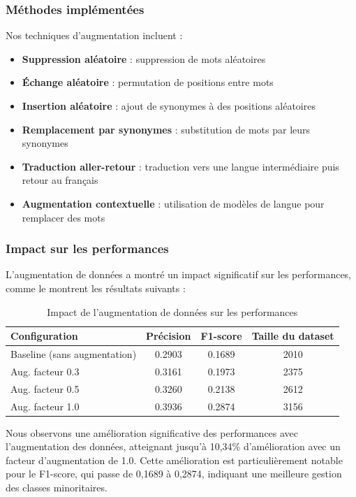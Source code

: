 \documentclass[a4paper,11pt]{article}
\begin{document}
\subsubsection{Méthodes implémentées}
Nos techniques d'augmentation incluent :

\begin{itemize}
    \item \textbf{Suppression aléatoire} : suppression de mots aléatoires
    \item \textbf{Échange aléatoire} : permutation de positions entre mots
    \item \textbf{Insertion aléatoire} : ajout de synonymes à des positions aléatoires
    \item \textbf{Remplacement par synonymes} : substitution de mots par leurs synonymes
    \item \textbf{Traduction aller-retour} : traduction vers une langue intermédiaire puis retour au français
    \item \textbf{Augmentation contextuelle} : utilisation de modèles de langue pour remplacer des mots
\end{itemize}

\subsubsection{Impact sur les performances}
L'augmentation de données a montré un impact significatif sur les performances, comme le montrent les résultats suivants :

\begin{table}[h]
\centering
\begin{tabular}{lccc}
\toprule
\textbf{Configuration} & \textbf{Précision} & \textbf{F1-score} & \textbf{Taille du dataset} \\
\midrule
Baseline (sans augmentation) & 0.2903 & 0.1689 & 2010 \\
Aug. facteur 0.3 & 0.3161 & 0.1973 & 2375 \\
Aug. facteur 0.5 & 0.3260 & 0.2138 & 2612 \\
Aug. facteur 1.0 & 0.3936 & 0.2874 & 3156 \\
\bottomrule
\end{tabular}
\caption{Impact de l'augmentation de données sur les performances}
\label{tab:augmentation-results}
\end{table}

Nous observons une amélioration significative des performances avec l'augmentation des données, atteignant jusqu'à 10,34\% d'amélioration avec un facteur d'augmentation de 1.0. Cette amélioration est particulièrement notable pour le F1-score, qui passe de 0,1689 à 0,2874, indiquant une meilleure gestion des classes minoritaires.
\end{document}
